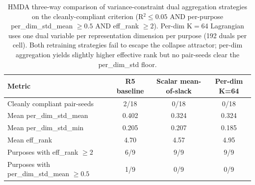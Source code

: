 \begin{table}[t]
  \centering
  \caption{HMDA three-way comparison of variance-constraint dual aggregation
  strategies on the cleanly-compliant criterion (R$^2 \leq 0.05$ AND per-purpose
  per\_dim\_std\_mean $\geq 0.5$ AND eff\_rank $\geq 2$). Per-dim K$=$64
  Lagrangian uses one dual variable per representation dimension per purpose
  (192 duals per cell). Both retraining strategies fail to escape the collapse
  attractor; per-dim aggregation yields slightly higher effective rank but no
  pair-seeds clear the per\_dim\_std floor.}
  \label{tab:perdim-vs-scalar}
  \begin{tabular}{lccc}
    \toprule
    Metric & R5 baseline & Scalar mean-of-slack & Per-dim K=64 \\
    \midrule
    Cleanly compliant pair-seeds & 2/18 & 0/18 & 0/18 \\
    Mean per\_dim\_std\_mean & 0.402 & 0.324 & 0.324 \\
    Mean per\_dim\_std\_min & 0.205 & 0.207 & 0.185 \\
    Mean eff\_rank & 4.70 & 4.57 & 4.95 \\
    Purposes with eff\_rank $\geq 2$ & 6/9 & 9/9 & 9/9 \\
    Purposes with per\_dim\_std\_mean $\geq 0.5$ & 1/9 & 0/9 & 0/9 \\
    \bottomrule
  \end{tabular}
\end{table}
